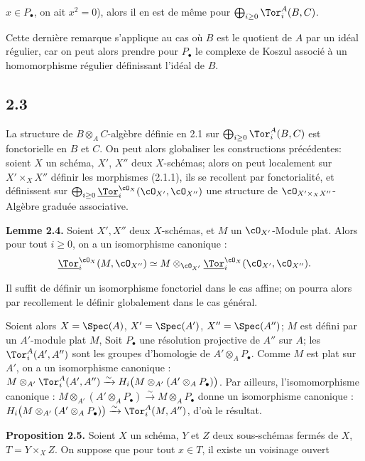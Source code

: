 \(x\in P_\bullet\), on ait \(x^2=0\)), alors il en est de même pour \(\bigoplus_{i\ge0}\Tor_i^A(B,C)\).

Cette dernière remarque s'applique au cas où \(B\) est le quotient de \(A\) par un idéal régulier, car on peut alors prendre pour \(P_\bullet\) le complexe de Koszul associé à un homomorphisme régulier définissant l'idéal de \(B\).

\subsection*{2.3}
La structure de \(B\otimes_A C\)-algèbre définie en 2.1 sur \(\bigoplus_{i\ge0}\Tor_i^A(B,C)\) est fonctorielle en \(B\) et \(C\). On peut alors globaliser les constructions précédentes: soient \(X\) un schéma, \(X'\), \(X''\) deux \(X\)-schémas; alors on peut localement sur \(X'\times_X X''\) définir les morphismes (2.1.1), ils se recollent par fonctorialité, et définissent sur \(\bigoplus_{i\ge0}\underline{\Tor}_i^{\cO_X}(\cO_{X'},\cO_{X''})\) une structure de \(\cO_{X'\times_X X''}\)-Algèbre graduée associative.

\textbf{Lemme 2.4.} Soient \(X',X''\) deux \(X\)-schémas, et \(M\) un \(\cO_{X'}\)-Module plat. Alors pour tout \(i\ge0\), on a un isomorphisme canonique :
\begin{equation}\notag
\underline{\Tor}_i^{\cO_X}(M,\cO_{X''})\simeq
M\otimes_{\cO_{X'}}\underline{\Tor}_i^{\cO_X}(\cO_{X'},\cO_{X''}).
\end{equation}

Il suffit de définir un isomorphisme fonctoriel dans le cas affine; on pourra alors par recollement le définir globalement dans le cas général.

Soient alors \(X=\Spec(A)\), \(X'=\Spec(A')\), \(X''=\Spec(A'')\); \(M\) est défini par un \(A'\)-module plat \(M\), Soit \(P_\bullet\) une résolution projective de \(A''\) sur \(A\); les \(\Tor_i^A(A',A'')\) sont les groupes d'homologie de \(A'\otimes_A P_\bullet\). Comme \(M\) est plat sur \(A'\), on a un isomorphisme canonique : \(M\otimes_{A'}\Tor_i^A(A',A'')\xrightarrow{\sim}H_i\bigl(M\otimes_{A'}(A'\otimes_A P_\bullet)\bigr)\). Par ailleurs, l'isomomorphisme canonique : \(M\otimes_{A'}(A'\otimes_A P_\bullet)\xrightarrow{\sim}M\otimes_A P_\bullet\) donne un isomorphisme canonique : \(H_i\bigl(M\otimes_{A'}(A'\otimes_A P_\bullet)\bigr)\xrightarrow{\sim}\Tor_i^A(M,A'')\), d'où le résultat.

\textbf{Proposition 2.5.} Soient \(X\) un schéma, \(Y\) et \(Z\) deux sous-schémas fermés de \(X\), \(T=Y\times_X Z\). On suppose que pour tout \(x\in T\), il existe un voisinage ouvert

